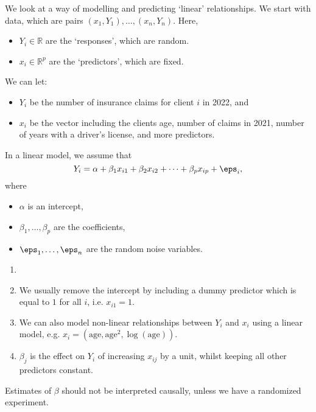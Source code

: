 \documentclass[12pt]{article}
\begin{document}
We look at a way of modelling and predicting `linear' relationships. We start with data, which are pairs $(x_1, Y_1), \ldots, (x_n, Y_n)$. Here,
\begin{itemize}
	\item $Y_i \in \mathbb{R}$ are the `responses', which are random.
	\item $x_i \in \mathbb{R}^{p}$ are the `predictors', which are fixed.
\end{itemize}

\begin{exbox}
	We can let:
	\begin{itemize}
		\item $Y_i$ be the number of insurance claims for client $i$ in 2022, and 
		\item $x_i$ be the vector including the clients age, number of claims in 2021, number of years with a driver's license, and more predictors.
	\end{itemize}
\end{exbox}

In a linear model, we assume that
\[
Y_i = \alpha + \beta_1 x_{i1} + \beta_2 x_{i2} + \cdots + \beta_p x_{ip} + \eps_i,
\]
where 
\begin{itemize}
	\item $\alpha$ is an intercept,
	\item $\beta_1, \ldots, \beta_p$ are the coefficients,
	\item $\eps_1, \ldots, \eps_n$ are the random noise variables.
\end{itemize}

\begin{remark}
	\begin{enumerate}
		\item[]
		\item We usually remove the intercept by including a dummy predictor which is equal to $1$ for all $i$, i.e. $x_{i1} = 1$.
		\item We can also model non-linear relationships between $Y_i$ and $x_i$ using a linear model, e.g. $x_i = (\text{age}, \text{age}^2, \log(\text{age}))$.
		\item $\beta_j$ is the effect on $Y_i$ of increasing $x_{ij}$ by a unit, whilst keeping all other predictors constant.
	\end{enumerate}
\end{remark}

Estimates of $\beta$ should not be interpreted causally, unless we have a randomized experiment.
\end{document}
